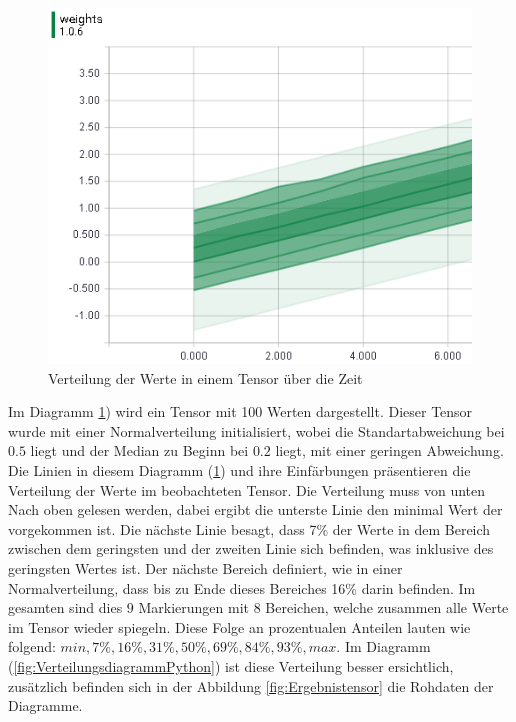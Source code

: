 \begin{figure}
	\centering
	\includegraphics[scale=0.8]{images/Distripution-small.png}
	\caption{Verteilung der Werte in einem Tensor über die Zeit}
	\label{fig:Verteilungsdiagram}
\end{figure}

\noindent
Im Diagramm \ref{fig:Verteilungsdiagram}) wird ein Tensor mit 100 Werten dargestellt. 
Dieser Tensor wurde mit einer Normalverteilung initialisiert, wobei die Standartabweichung bei $0.5$ liegt und der Median zu Beginn bei $0.2$ liegt, mit einer geringen Abweichung. 
Die Linien in diesem Diagramm (\ref{fig:Verteilungsdiagram}) und ihre Einfärbungen präsentieren die Verteilung der Werte im beobachteten Tensor. 
Die Verteilung muss von unten Nach oben gelesen werden, dabei ergibt die unterste Linie den minimal Wert der vorgekommen ist. 
Die nächste Linie besagt, dass 7\% der Werte in dem Bereich zwischen dem geringsten und der zweiten Linie sich befinden, was inklusive des geringsten Wertes ist.  
Der nächste Bereich definiert, wie in einer Normalverteilung, dass bis zu Ende dieses Bereiches 16\% darin befinden. 
Im gesamten sind dies $9$ Markierungen mit 8 Bereichen, welche zusammen alle Werte im Tensor wieder spiegeln. 
Diese Folge an prozentualen Anteilen lauten wie folgend: $min, 7\%, 16\%, 31\%, 50\%, 69\%, 84\%, 93\%, max$. 
Im Diagramm (\ref{fig:VerteilungsdiagrammPython}) ist diese Verteilung besser ersichtlich, zusätzlich befinden sich in der Abbildung \ref{fig:Ergebnistensor} die Rohdaten der Diagramme. 

